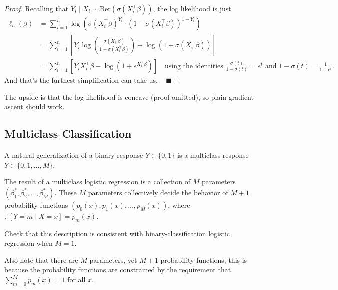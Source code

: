 \begin{proof}
    Recalling that $Y_i \mid X_i \sim \mathrm{Ber}\left(
        \sigma\left(X_i^{\top}\beta\right)
    \right)$, the log likelihood is just
    \begin{align*}
        \ell_n(\beta)
        & = \sum_{i = 1}^n \log\left(
            \sigma(X_i^{\top}\beta)^{Y_i} \cdot
            \left(1 - \sigma(X_i^{\top}\beta)\right)^{1 - Y_i}
        \right) \\
        & = \sum_{i = 1}^n \left[
            Y_i \log\left(
                \frac{\sigma(X_i^{\top}\beta)}{1 - \sigma(X_i^{\top}\beta)}
            \right)
            + \log(1 - \sigma(X_i^{\top}\beta))
        \right] \\
        & = \sum_{i = 1}^n \left[
        Y_iX_i^{\top}\beta - \log\left(
            1 + e^{X_i^{\top}\beta}
        \right)
        \right] ~~~ \text{ using the identities }
        \frac{\sigma(t)}{1 - \sigma(t)} = e^t
        \text{ and }
        1 - \sigma(t) = \frac{1}{1 + e^t}.
    \end{align*}
    And that's the furthest simplification can take us. ~ $\blacksquare$
\end{proof}

The upside is that
the log likelihood is concave (proof omitted),
so plain gradient ascent should work.

\subsection{Multiclass Classification}

A natural generalization of a binary response $Y \in \{0, 1\}$
is a multiclass response $Y \in \{0, 1, \dots, M\}$.

The result of a multiclass logistic regression
is a collection of $M$ parameters
$(\beta_1^*, \beta_2^*, \dots, \beta_M^*)$.
These $M$ parameters collectively decide the behavior
of $M + 1$ probability functions $(p_0(x), p_1(x), \dots, p_M(x))$,
where $\mathbb{P}[Y = m \mid X = x] = p_m(x)$.

\begin{remark}
    Check that this description is consistent with
    binary-classification logistic regression when $M = 1$.

    Also note that there are $M$ parameters,
    yet $M + 1$ probability functions; this is because
    the probability functions are constrained by the requirement
    that $\sum_{m = 0}^M p_m(x) = 1$ for all $x$.
\end{remark}

